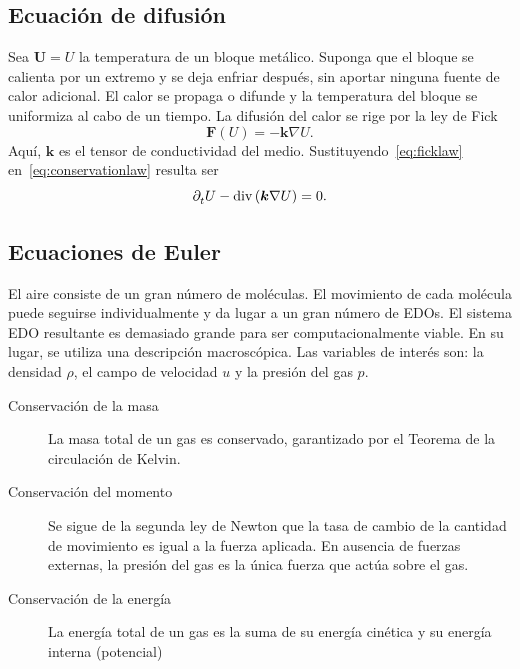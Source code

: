 \subsection*{Ecuación de difusión}

Sea $\bm{U}=U$ la temperatura de un bloque metálico.
Suponga que el bloque se calienta por un extremo y se deja enfriar
después, sin aportar ninguna fuente de calor adicional.
El calor se propaga o difunde y la temperatura del bloque se
uniformiza al cabo de un tiempo.
La difusión del calor se rige por la ley de Fick
\begin{equation}\label{eq:ficklaw}
	\bm{F}\left(U\right)=
	-\bm{k}\nabla U.
\end{equation}
Aquí, $\bm{k}$ es el tensor de conductividad del medio.
Sustituyendo~\eqref{eq:ficklaw} en~\eqref{eq:conservationlaw}
resulta ser
\begin{equation*}
	\difcp{U}{t}-
	\operatorname{div}
	\left(\bm{k}\nabla U\right)=
	0.
\end{equation*}

\subsection*{Ecuaciones de Euler}

El aire consiste de un gran número de moléculas.
El movimiento de cada molécula puede seguirse individualmente y
da lugar a un gran número de EDOs.
El sistema EDO resultante es demasiado grande para ser
computacionalmente viable.
En su lugar, se utiliza una descripción macroscópica.
Las variables de interés son: la densidad $\rho$, el campo de
velocidad $u$ y la presión del gas $p$.

\begin{description}
	\item[Conservación de la masa]

	      La masa total de un gas es conservado, garantizado
	      por el Teorema de la circulación de Kelvin.

	\item[Conservación del momento]

	      Se sigue de la segunda ley de Newton que la tasa de cambio de
	      la cantidad de movimiento es igual a la fuerza aplicada.
	      En ausencia de fuerzas externas, la presión del gas es la
	      única fuerza que actúa sobre el gas.

	\item[Conservación de la energía]

	      La energía total de un gas es la suma de su energía cinética
	      y su energía interna (potencial)
\end{description}

